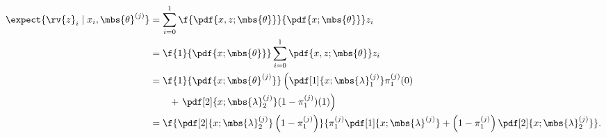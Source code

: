 \documentclass{tufte-handout}
\begin{document}
    \begin{align}
        \expect{\rv{z}_{i} \mid x_{i}, \mbs{\theta}^{(j)}}
        &=
        \sum_{i=0}^{1}\f{\pdf{x,z;\mbs{\theta}}}{\pdf{x; \mbs{\theta}}}z_{i}\\
        &=
        \f{1}{\pdf{x; \mbs{\theta}}}\sum_{i=0}^{1}\pdf{x,z;\mbs{\theta}}z_{i}\\
        &=
        \f{1}{\pdf{x; \mbs{\theta}^{(j)}}}\left( \pdf[1]{x; \mbs{\lambda}_{1}^{(j)}}\pi_{1}^{(j)}(0)\right.\nonumber\\&\qquad + \left.\pdf[2]{x; \mbs{\lambda}_{2}^{(j)}}(1-\pi_{1}^{(j)})(1) \right)\\
        &=
        \f{
            \pdf[2]{x; \mbs{\lambda}_{2}^{(j)}}\left(1-\pi_{1}^{(j)}\right)
        }{
            \pi_{1}^{(j)}\pdf[1]{x; \mbs{\lambda}^{(j)}} + \left( 1-\pi_{1}^{(j)} \right)\pdf[2]{x; \mbs{\lambda}_{2}^{(j)}}
        }.
    \end{align}
    
    
\end{document}

